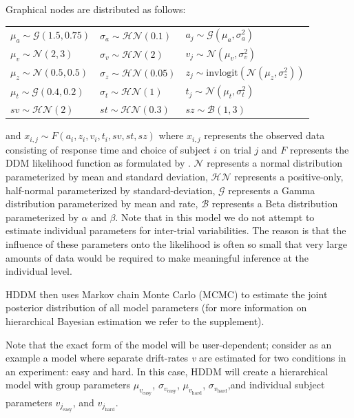 \documentclass[letterpaper,10pt,english]{article}
\begin{document}
Graphical nodes are distributed as follows:\\
\begin{center}
\begin{tabular}{l|l|l}
$\mu_{a} \sim \mathcal{G}(1.5, 0.75)$ & $\sigma_{a} \sim
\mathcal{HN}(0.1)$ & $a_{j} \sim \mathcal{G}(\mu_{a}, \sigma_{a}^2)$
\\
$\mu_{v} \sim \mathcal{N}(2, 3)$ & $\sigma_{v} \sim \mathcal{HN}(2)$ &
$v_{j} \sim \mathcal{N}(\mu_{v}, \sigma_{v}^2)$ \\

$\mu_{z} \sim \mathcal{N}(0.5, 0.5)$ & $\sigma_{z} \sim
\mathcal{HN}(0.05)$ & $z_{j} \sim \text{invlogit}(\mathcal{N}(\mu_{z},
\sigma_{z}^2))$ \\

$\mu_{t} \sim \mathcal{G}(0.4, 0.2)$ & $\sigma_{t} \sim
\mathcal{HN}(1)$ & $t_{j} \sim \mathcal{N}(\mu_{t}, \sigma_{t}^2)$\\

$sv \sim \mathcal{HN}(2)$ & $st \sim \mathcal{HN}(0.3)$ & $sz \sim
\mathcal{B}(1, 3)$
\end{tabular}
\end{center}
and $x_{i, j} \sim F(a_{i}, z_{i}, v_{i}, t_{i}, sv, st, sz)$ where $x_{i, j}$ represents the observed data consisting of response time and choice of subject $i$ on trial $j$ and $F$ represents the DDM likelihood function as formulated by \citet{NavarroFuss09}. $\mathcal{N}$ represents a normal distribution parameterized by mean and standard deviation, $\mathcal{HN}$ represents a positive-only, half-normal parameterized by standard-deviation, $\mathcal{G}$ represents a Gamma distribution parameterized by mean and rate, $\mathcal{B}$ represents a Beta distribution parameterized by $\alpha$ and $\beta$. Note that in this model we do not attempt to estimate individual parameters for inter-trial variabilities. The reason is that the influence of these parameters onto the likelihood is often so small that very large amounts of data would be required to make meaningful inference at the individual level.

HDDM then uses Markov chain Monte Carlo (MCMC) \citep{GamermanLopes06} to estimate the joint posterior distribution of all model parameters (for more information on hierarchical Bayesian estimation we refer to the supplement).

Note that the exact form of the model will be user-dependent; consider
as an example a model where separate drift-rates \emph{v} are
estimated for two conditions in an experiment: easy and hard. In this
case, HDDM will create a hierarchical model with group parameters
$\mu_{v_{\text{easy}}}$, $\sigma_{v_{\text{easy}}}$,
$\mu_{v_{\text{hard}}}$, $\sigma_{v_{\text{hard}}}$,and individual
subject parameters $v_{j_{\text{easy}}}$, and $v_{j_{\text{hard}}}$.
\end{document}
